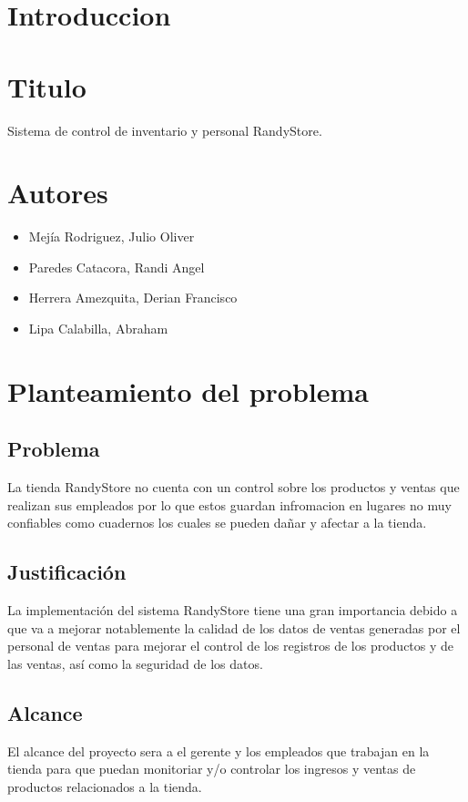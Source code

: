 \documentclass[12pt,letterpaper]{article}
\begin{document}
\section{Introduccion} 

\section{Titulo} 

Sistema de control de inventario y personal RandyStore.

\section{Autores} 
\begin{itemize}
    \item Mej\'ia Rodriguez, Julio Oliver    
    \item Paredes Catacora, Randi Angel 
    \item Herrera Amezquita, Derian Francisco
    \item Lipa Calabilla, Abraham
\end{itemize}

\section{Planteamiento del problema} 
    \subsection{Problema}
    La tienda RandyStore no cuenta con un control sobre los productos y ventas que realizan sus empleados   
    por lo que estos guardan infromacion en lugares no muy confiables como cuadernos los cuales se pueden dañar 
    y afectar a la tienda.
    \subsection{Justificación}
    La implementación del sistema RandyStore tiene una gran importancia debido a que va a mejorar notablemente la calidad de los datos de ventas generadas por el personal de ventas para mejorar el control de los registros de los productos y de las ventas, así como la seguridad de los datos.
    \subsection{Alcance}
    El alcance del proyecto sera a el gerente y los empleados que trabajan en la tienda para que puedan monitoriar
    y/o controlar los ingresos y ventas de productos relacionados a la tienda.
\end{document}
